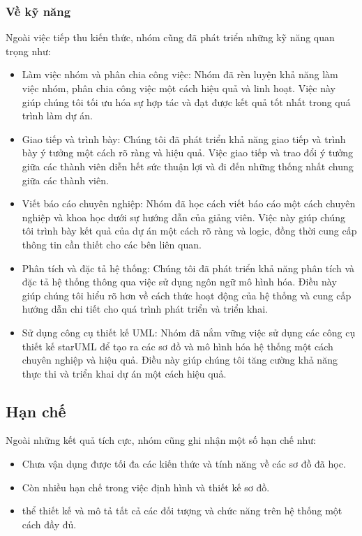 \subsubsection{Về kỹ năng}
Ngoài việc tiếp thu kiến thức, nhóm cũng đã phát triển những kỹ năng quan trọng như:
\begin{itemize}[label={--}]
  \item Làm việc nhóm và phân chia công việc: Nhóm đã rèn luyện khả năng làm việc nhóm, phân chia công việc một cách hiệu quả và linh hoạt. Việc này giúp chúng tôi tối ưu hóa sự hợp tác và đạt được kết quả tốt nhất trong quá trình làm dự án.
  \item Giao tiếp và trình bày: Chúng tôi đã phát triển khả năng giao tiếp và trình bày ý tưởng một cách rõ ràng và hiệu quả. Việc giao tiếp và trao đổi ý tưởng giữa các thành viên diễn hết sức thuận lợi và đi đến những thống nhất chung giữa các thành viên.
  \item Viết báo cáo chuyên nghiệp: Nhóm đã học cách viết báo cáo một cách chuyên nghiệp và khoa học dưới sự hướng dẫn của giảng viên. Việc này giúp chúng tôi trình bày kết quả của dự án một cách rõ ràng và logic, đồng thời cung cấp thông tin cần thiết cho các bên liên quan.
  \item Phân tích và đặc tả hệ thống: Chúng tôi đã phát triển khả năng phân tích và đặc tả hệ thống thông qua việc sử dụng ngôn ngữ mô hình hóa. Điều này giúp chúng tôi hiểu rõ hơn về cách thức hoạt động của hệ thống và cung cấp hướng dẫn chi tiết cho quá trình phát triển và triển khai.
  \item Sử dụng công cụ thiết kế UML: Nhóm đã nắm vững việc sử dụng các công cụ thiết kế starUML để tạo ra các sơ đồ và mô hình hóa hệ thống một cách chuyên nghiệp và hiệu quả. Điều này giúp chúng tôi tăng cường khả năng thực thi và triển khai dự án một cách hiệu quả.
\end{itemize}

\subsection{Hạn chế}
Ngoài những kết quả tích cực, nhóm cũng ghi nhận một số hạn chế như:
\begin{itemize}[label={--}]
  \item Chưa vận dụng được tối đa các kiến thức và tính năng về các sơ đồ đã học.
  \item Còn nhiều hạn chế trong việc định hình và thiết kế sơ đồ.
  \item thể thiết kế và mô tả tất cả các đối tượng và chức năng trên hệ thống một cách đầy đủ.
\end{itemize}

